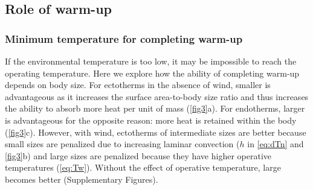 \subsection*{Role of warm-up}

\subsubsection*{Minimum temperature for completing warm-up}
If the environmental temperature is too low, it may be impossible to reach the operating temperature.
Here we explore how the ability of completing warm-up depends on body size.
For ectotherms in the absence of wind, smaller is advantageous as it increases the surface area-to-body size ratio and thus increases the ability to absorb more heat per unit of mass  (\cref{fig3}a).
For endotherms, larger is advantageous for the opposite reason: more heat is retained within the body  (\cref{fig3}c).
However, with wind, ectotherms of intermediate sizes are better because small sizes are penalized due to increasing laminar convection ($h$ in \cref{eq:dTn} and \cref{fig3}b)  and large sizes are penalized because they have higher operative temperatures (\cref{eq:Tw}).
Without the effect of operative temperature, large becomes better (Supplementary Figures).
